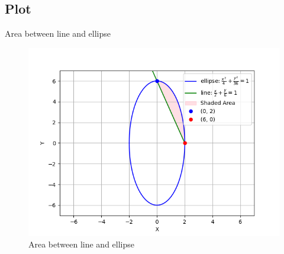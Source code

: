 \documentclass{beamer}
\theoremstyle{remark}
\numberwithin{equation}{section}
\begin{document}
        \subsection{Plot}
        \begin{frame}{Area between line and ellipse}
            \begin{figure}[ht]
   \centering
   \includegraphics[width=0.7\columnwidth]{figs/fig.png}
    \caption{Area between line and ellipse}
\end{figure}
        \end{frame}
        
\end{document}

